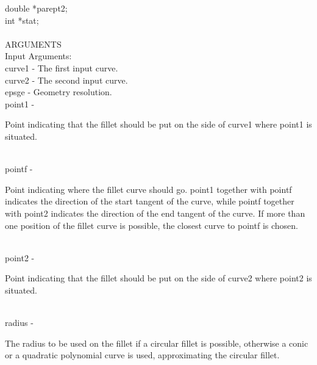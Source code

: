                 \>\>    double  \>      *{\fov parept2};\\
                \>\>    int     \>      *{\fov stat};\\
\\
ARGUMENTS\\
        \>Input Arguments:\\
        \>\>    {\fov curve1}   \> - \> The first input curve.\\
        \>\>    {\fov curve2}   \> - \> The second input curve.\\
        \>\>    {\fov epsge}    \> - \> Geometry resolution.\\
        \>\>    {\fov point1}   \> - \> \begin{minipg2}
                        Point indicating that the fillet should be put on the
                        side of {\fov curve1} where {\fov point1} is situated.
                                \end{minipg2}\\[0.3ex]
        \>\>    {\fov pointf}\> - \>    \begin{minipg2}
                        Point indicating where the fillet curve should go.
                        {\fov point1} together with {\fov pointf}
                        indicates the direction of the start tangent of
                        the curve, while pointf together with {\fov point2}
                        indicates the direction of the end tangent of
                        the curve.  If more than one position of the fillet
                        curve is possible, the closest curve to {\fov pointf}
                        is chosen.
                                \end{minipg2}\\[0.3ex]
        \>\>    {\fov point2}   \> - \> \begin{minipg2}
                        Point indicating that the fillet should be put on the
                        side of {\fov curve2} where {\fov point2} is situated.
                                \end{minipg2}\\[0.3ex]
        \>\>    {\fov radius}   \> - \> \begin{minipg2}
                The radius to be used on the fillet if a circular fillet is
                possible, otherwise a conic or a quadratic polynomial
                curve is used, approximating the circular fillet.
                                \end{minipg2}\\[0.3ex]
